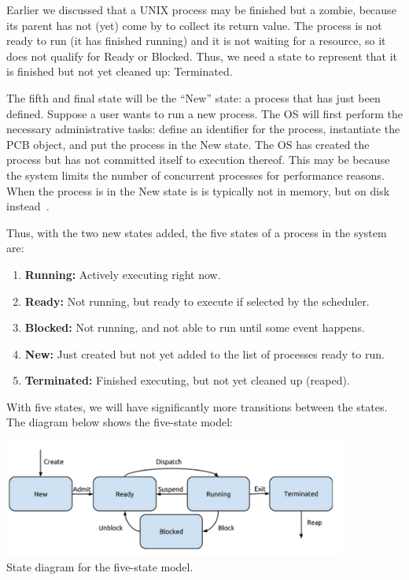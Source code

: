 \documentclass[a4paper]{report}
\begin{document}
Earlier we discussed that a UNIX process may be finished but a zombie, because its parent has not (yet) come by to collect its return value. The process is not ready to run (it has finished running) and it is not waiting for a resource, so it does not qualify for Ready or Blocked. Thus, we need a state to represent that it is finished but not yet cleaned up: Terminated.

The fifth and final state will be the ``New'' state: a process that has just been defined. Suppose a user wants to run a new process. The OS will first perform the necessary administrative tasks: define an identifier for the process, instantiate the PCB object, and put the process in the New state. The OS has created the process but has not committed itself to execution thereof. This may be because the system limits the number of concurrent processes for performance reasons. When the process is in the New state is is typically not in memory, but on disk instead~\cite{osi}.

Thus, with the two new states added, the five states of a process in the system are:

\begin{enumerate}
	\item \textbf{Running:} Actively executing right now.
	\item \textbf{Ready:} Not running, but ready to execute if selected by the scheduler.
	\item \textbf{Blocked:} Not running, and not able to run until some event happens.
	\item \textbf{New:} Just created but not yet added to the list of processes ready to run.
	\item \textbf{Terminated:} Finished executing, but not yet cleaned up (reaped).
\end{enumerate}

With five states, we will have significantly more transitions between the states. The diagram below shows the five-state model:

\begin{center}
	\includegraphics[width=0.85\textwidth]{images/5-state-model.png}\\
	State diagram for the five-state model.
\end{center}
\end{document}
